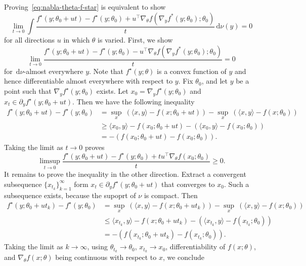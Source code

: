 \documentclass[10pt]{article}
\newcommand{\ud}{\,\mathrm{d}}
\numberwithin{equation}{section}
\begin{document}
	Proving~\eqref{eq:nabla-theta-f-star} is equivalent to show
	\begin{equation*}
	\lim_{t \to 0} \int \frac{f^\star(y ;\theta_0+ut) - f^\star(y;\theta_0) + u^\top \nabla_\theta f(\nabla_y f^*(y;\theta_0);\theta_0)}{t}\ud \nu(y)= 0
	\end{equation*}
	for all directions $u$ in which $\theta$ is varied. First, we show
	\begin{equation*}
	\lim_{t \to 0} \frac{f^\star(y ;\theta_0+ut) - f^\star(y;\theta_0) - u^\top \nabla_\theta f(\nabla_y f^*(y;\theta_0);\theta_0)}{t}= 0
	\end{equation*}
	for $\ud \nu$-almost everywhere $y$.
	Note that $f^\star(y;\theta)$ is a convex function of $y$ and hence differentiable almost everywhere with respect to $y$. Fix $\theta_0$, and let $y$ be a point such that $\nabla_y f^\star(y;\theta_0)$ exists. Let $x_0 = \nabla_y f^\star(y;\theta_0)$ and $x_t \in \partial_y f^\star(y;\theta_0+ut)$. Then we have the following inequality
	\begin{align*}
	f^\star(y ;\theta_0+ut) - f^\star(y;\theta_0) &=\sup_x~(\langle x, y\rangle - f(x;\theta_0+ut)) - \sup_x~(\langle x, y\rangle - f(x;\theta_0))\\&\geq \langle x_0 , y\rangle - f(x_0;\theta_0+ut) - ( \langle x_0, y\rangle - f(x_0;\theta_0))\\
	&= -(f(x_0;\theta_0+ut)-f(x_0;\theta_0)).
	\end{align*}
	Taking the limit as $t \to 0$ proves 
	\begin{equation*}
	\limsup_{t \to 0} \frac{f^\star(y ;\theta_0+ut) - f^\star(y;\theta_0) +t u^\top \nabla_\theta f(x_0;\theta_0)}{t} \geq 0.
	\end{equation*}
	It remains to prove the inequality in the other direction. 
	Extract a convergent subsequence $\{x_{t_k}\}_{k=1}^\infty$ form $x_t \in \partial_y f^\star(y;\theta_0+ut)$ that converges to $x_0$. Such a subsequence exists, because the supoprt of $\nu$ is compact. Then 
	\begin{align*}
	f^\star(y ;\theta_0+ut_k) - f^\star(y;\theta_0) &=\sup_x~(\langle x, y\rangle - f(x;\theta_0+ut_k)) - \sup_x~(\langle x, y\rangle - f(x;\theta_0))\\&\leq \langle x_{t_k} , y \rangle - f(x;\theta_0+ut_k) - ( \langle x_{t_k} , y \rangle - f(x_{t_k};\theta_0))\\
	&= -(f(x_{t_k};\theta_0+ut_k)-f(x_{t_k};\theta_0)).
	\end{align*}
	Taking the limit as $k\to \infty$, using $\theta_{t_k} \to \theta_0$, $x_{t_k} \to x_0$, differentiability of $f(x;\theta) $, and $\nabla_\theta f(x;\theta)$ being continuous with respect to $x$, we conclude
\end{document}

